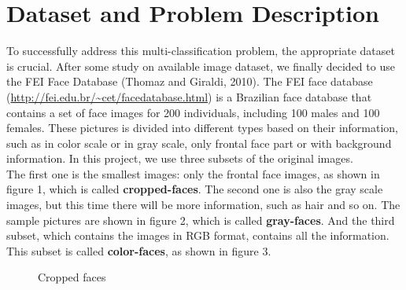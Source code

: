 \documentclass[11pt,letterpaper]{article}
\begin{document}
\section{Dataset and Problem Description}

To successfully address this multi-classification problem, the appropriate dataset is crucial. After some study on available image dataset, we finally decided to use the FEI Face Database (Thomaz and Giraldi, 2010). The FEI face database (\url{http://fei.edu.br/~cet/facedatabase.html}) is a Brazilian face database that contains a set of face images for 200 individuals, including 100 males and 100 females. These pictures is divided into different types based on their information, such as in color scale or in gray scale, only frontal face part or with background information. In this project, we use three subsets of the original images.\\

The first one is the smallest images: only the frontal face images, as shown in figure 1, which is called {\bf cropped-faces}. The second one is also the gray scale images, but this time there will be more information, such as hair and so on. The sample pictures are shown in figure 2, which is called {\bf gray-faces}. And the third subset, which contains the images in RGB format, contains all the information. This subset is called {\bf color-faces}, as shown in figure 3.\\

\begin{figure}[H]
\centering
{}
\caption{Cropped faces}
\label{Fig.lable}
\end{figure}
\end{document}
